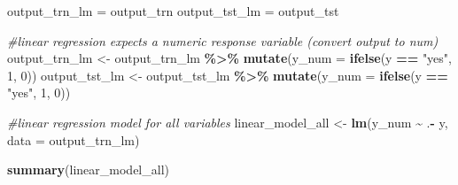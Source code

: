 \documentclass[
]{article}
\newenvironment{Shaded}{\begin{snugshade}}{\end{snugshade}}
\newcommand{\AttributeTok}[1]{\textcolor[rgb]{0.13,0.29,0.53}{#1}}
\newcommand{\CommentTok}[1]{\textcolor[rgb]{0.56,0.35,0.01}{\textit{#1}}}
\newcommand{\DecValTok}[1]{\textcolor[rgb]{0.00,0.00,0.81}{#1}}
\newcommand{\FunctionTok}[1]{\textcolor[rgb]{0.13,0.29,0.53}{\textbf{#1}}}
\newcommand{\NormalTok}[1]{#1}
\newcommand{\OtherTok}[1]{\textcolor[rgb]{0.56,0.35,0.01}{#1}}
\newcommand{\SpecialCharTok}[1]{\textcolor[rgb]{0.81,0.36,0.00}{\textbf{#1}}}
\newcommand{\StringTok}[1]{\textcolor[rgb]{0.31,0.60,0.02}{#1}}
\begin{document}
\begin{Shaded}
\begin{Highlighting}[]
\NormalTok{output\_trn\_lm }\OtherTok{=}\NormalTok{ output\_trn}
\NormalTok{output\_tst\_lm }\OtherTok{=}\NormalTok{ output\_tst}

\CommentTok{\#linear regression expects a numeric response variable (convert output to num)}
\NormalTok{output\_trn\_lm }\OtherTok{\textless{}{-}}\NormalTok{ output\_trn\_lm }\SpecialCharTok{\%\textgreater{}\%} \FunctionTok{mutate}\NormalTok{(}\AttributeTok{y\_num =} \FunctionTok{ifelse}\NormalTok{(y }\SpecialCharTok{==} \StringTok{"yes"}\NormalTok{, }\DecValTok{1}\NormalTok{, }\DecValTok{0}\NormalTok{))}
\NormalTok{output\_tst\_lm }\OtherTok{\textless{}{-}}\NormalTok{ output\_tst\_lm }\SpecialCharTok{\%\textgreater{}\%} \FunctionTok{mutate}\NormalTok{(}\AttributeTok{y\_num =} \FunctionTok{ifelse}\NormalTok{(y }\SpecialCharTok{==} \StringTok{"yes"}\NormalTok{, }\DecValTok{1}\NormalTok{, }\DecValTok{0}\NormalTok{))}

\CommentTok{\#linear regression model for all variables }
\NormalTok{linear\_model\_all }\OtherTok{\textless{}{-}} \FunctionTok{lm}\NormalTok{(y\_num }\SpecialCharTok{\textasciitilde{}}\NormalTok{ .}\SpecialCharTok{{-}}\NormalTok{ y, }\AttributeTok{data =}\NormalTok{ output\_trn\_lm)}


\FunctionTok{summary}\NormalTok{(linear\_model\_all)}
\end{Highlighting}
\end{Shaded}
\end{document}
